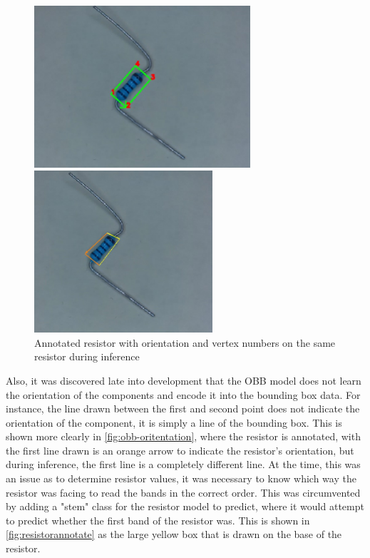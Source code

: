\begin{figure}[H]
    \centering
    \begin{minipage}[t]{0.49\textwidth}
        \centering
        \includegraphics[height=6cm]{imgs/cv/numberedboundingbox.jpg}
    \end{minipage}
    \hfill
    \begin{minipage}[t]{0.49\textwidth}
        \centering
        \includegraphics[height=6cm]{imgs/cv/resistor label.jpg}
    \end{minipage}
    \caption{Annotated resistor with orientation and vertex numbers on the same resistor during inference}
    \label{fig:obb-oritentation}
  \end{figure}

Also, it was discovered late into development that the OBB model does not learn the orientation of the components and encode it into the bounding box data. For instance, the line drawn between the first and second point does not indicate the orientation of the component, it is simply a line of the bounding box. This is shown more clearly in \autoref{fig:obb-oritentation}, where the resistor is annotated, with the first line drawn is an orange arrow to indicate the resistor's orientation, but during inference, the first line is a completely different line. At the time, this was an issue as to determine resistor values, it was necessary to know which way the resistor was facing to read the bands in the correct order. This was circumvented by adding a "stem" class for the resistor model to predict, where it would attempt to predict whether the first band of the resistor was. This is shown in \autoref{fig:resistorannotate} as the large yellow box that is drawn on the base of the resistor.